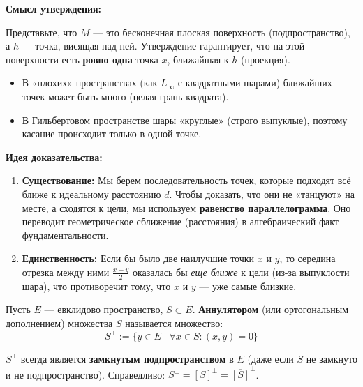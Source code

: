 \begin{idea}
	
	\textbf{Смысл утверждения:}
	
	Представьте, что $M$ — это бесконечная плоская поверхность (подпространство), а $h$ — точка, висящая над ней. Утверждение гарантирует, что на этой поверхности есть \textbf{ровно одна} точка $x$, ближайшая к $h$ (проекция).
	
	\begin{itemize}
		
		\item В «плохих» пространствах (как $L_\infty$ с квадратными шарами) ближайших точек может быть много (целая грань квадрата).
		
		\item В Гильбертовом пространстве шары «круглые» (строго выпуклые), поэтому касание происходит только в одной точке.
		
	\end{itemize}
	
	\textbf{Идея доказательства:}
	
	\begin{enumerate}
		
		\item \textbf{Существование:} Мы берем последовательность точек, которые подходят всё ближе к идеальному расстоянию $d$. Чтобы доказать, что они не «танцуют» на месте, а сходятся к цели, мы используем \textbf{равенство параллелограмма}. Оно переводит геометрическое сближение (расстояния) в алгебраический факт фундаментальности.
		
		\item \textbf{Единственность:} Если бы было две наилучшие точки $x$ и $y$, то середина отрезка между ними $\frac{x+y}{2}$ оказалась бы \textit{еще ближе} к цели (из-за выпуклости шара), что противоречит тому, что $x$ и $y$ — уже самые близкие.
		
	\end{enumerate}
	
\end{idea}

\begin{definition}[Аннулятор]
	Пусть $E$ --- евклидово пространство, $S \subset E$. \textbf{Аннулятором} (или ортогональным дополнением) множества $S$ называется множество:
	\[S^\perp := \{y \in E \mid \forall x \in S: (x, y) = 0\}\]
\end{definition}

\begin{remark}
	$S^\perp$ всегда является \textbf{замкнутым подпространством} в $E$ (даже если $S$ не замкнуто и не подпространство).
	Справедливо: $S^\perp = [S]^\perp = \overline{[S]}^\perp$.
\end{remark}

